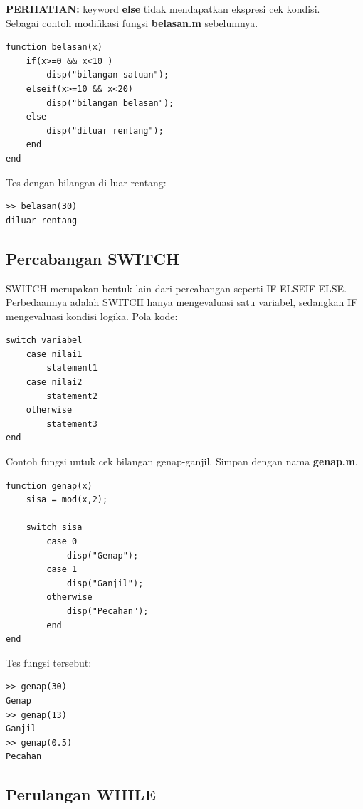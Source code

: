 \documentclass[12pt]{book}
\begin{document}
	\textbf{PERHATIAN:} keyword \textbf{else} tidak mendapatkan ekspresi cek kondisi.\\

	Sebagai contoh modifikasi fungsi \textbf{belasan.m} sebelumnya.
	\begin{verbatim}
function belasan(x)
	if(x>=0 && x<10 )
		disp("bilangan satuan");
	elseif(x>=10 && x<20)
		disp("bilangan belasan");
	else
		disp("diluar rentang");
	end
end
	\end{verbatim}

	\newpage
	Tes dengan bilangan di luar rentang:
	\begin{verbatim}
>> belasan(30)
diluar rentang
	\end{verbatim}

	\subsection{Percabangan SWITCH}

	SWITCH merupakan bentuk lain dari percabangan seperti IF-ELSEIF-ELSE.
	Perbedaannya adalah SWITCH hanya mengevaluasi satu variabel, sedangkan IF mengevaluasi kondisi logika.
	Pola kode:
	\begin{verbatim}
switch variabel
	case nilai1
		statement1
	case nilai2
		statement2
	otherwise
		statement3
end
	\end{verbatim}

	Contoh fungsi untuk cek bilangan genap-ganjil.
	Simpan dengan nama \textbf{genap.m}.
	\begin{verbatim}
function genap(x)
	sisa = mod(x,2);

	switch sisa
		case 0
			disp("Genap");
		case 1
			disp("Ganjil");
		otherwise
			disp("Pecahan");
		end
end
	\end{verbatim}

	Tes fungsi tersebut:
	\begin{verbatim}
>> genap(30)
Genap
>> genap(13)
Ganjil
>> genap(0.5)
Pecahan
	\end{verbatim}

	\newpage
	\subsection{Perulangan WHILE}
\end{document}
